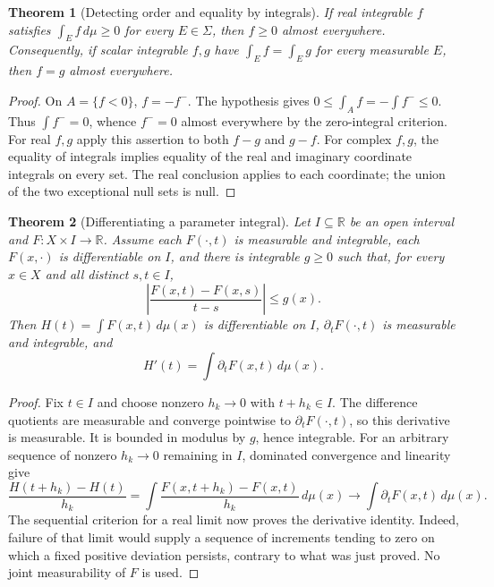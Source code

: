 \documentclass[11pt,oneside,openany]{book}
\newtheorem{theorem}{Theorem}[chapter]
\theoremstyle{definition}
\theoremstyle{remark}
\newcommand{\R}{\mathbb R}\newcommand{\C}{\mathbb C}
\newcommand{\family}[1]{}
\begin{document}
\begin{theorem}[Detecting order and equality by integrals]
\family{D11.06.integral_order_detection}\label{d11:06:integral-order-detection}
If real integrable $f$ satisfies $\int_Ef\,d\mu\geq0$ for every
$E\in\Sigma$, then $f\geq0$ almost everywhere. Consequently, if scalar
integrable $f,g$ have $\int_Ef=\int_Eg$ for every measurable $E$, then
$f=g$ almost everywhere.
\end{theorem}
\begin{proof}
On $A=\{f<0\}$, $f=-f^-$. The hypothesis gives
$0\leq\int_Af=-\int f^-\leq0$. Thus $\int f^-=0$, whence $f^-=0$
almost everywhere by the zero-integral criterion. For real $f,g$ apply
this assertion to both $f-g$ and $g-f$. For complex $f,g$, the equality
of integrals implies equality of the real and imaginary coordinate
integrals on every set. The real conclusion applies to each coordinate;
the union of the two exceptional null sets is null.
\end{proof}

\begin{theorem}[Differentiating a parameter integral]
\family{D11.06.parameter_differentiation}\label{d11:06:parameter-differentiation}
Let $I\subseteq\R$ be an open interval and $F:X\times I\to\R$.
Assume each $F(\cdot,t)$ is measurable and integrable, each
$F(x,\cdot)$ is differentiable on $I$, and there is integrable $g\geq0$
such that, for every $x\in X$ and all distinct $s,t\in I$,
\[
 \left|\frac{F(x,t)-F(x,s)}{t-s}\right|\leq g(x).
\]
Then $H(t)=\int F(x,t)\,d\mu(x)$ is differentiable on $I$,
$\partial_tF(\cdot,t)$ is measurable and integrable, and
\[
 H'(t)=\int\partial_tF(x,t)\,d\mu(x).
\]
\end{theorem}
\begin{proof}
Fix $t\in I$ and choose nonzero $h_k\to0$ with $t+h_k\in I$.
The difference quotients are measurable and converge pointwise to
$\partial_tF(\cdot,t)$, so this derivative is measurable. It is bounded
in modulus by $g$, hence integrable. For an arbitrary sequence of nonzero
$h_k\to0$ remaining in $I$, dominated convergence and linearity give
\[
 \frac{H(t+h_k)-H(t)}{h_k}
 =\int\frac{F(x,t+h_k)-F(x,t)}{h_k}\,d\mu(x)
 \longrightarrow\int\partial_tF(x,t)\,d\mu(x).
\]
The sequential criterion for a real limit now proves the derivative
identity. Indeed, failure of that limit would supply a sequence of
increments tending to zero on which a fixed positive deviation persists,
contrary to what was just proved. No joint measurability of $F$ is used.
\end{proof}
\end{document}
